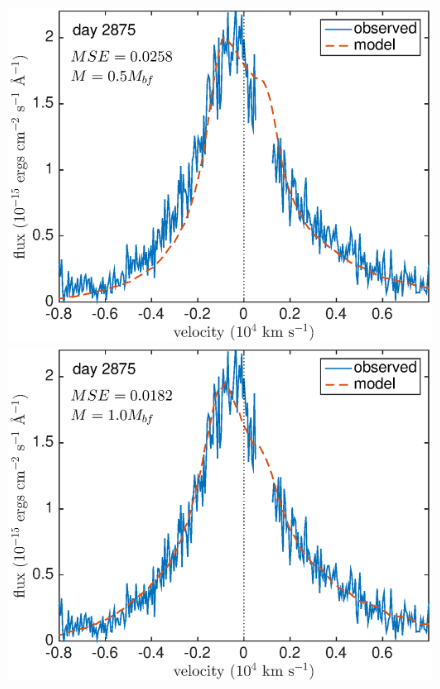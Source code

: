 \begin{figure}
\includegraphics[clip = true, scale=0.43, trim=10 22 45 0]{chapters/chapter5/images/MSE/d2875_M/d2875_M0_5}
\includegraphics[clip = true, scale=0.43, trim=42 22 45 0]{chapters/chapter5/images/MSE/d2875_M/d2875_M1}


\end{figure}
